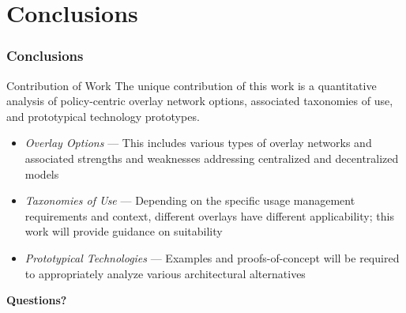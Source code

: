 \section{Conclusions}
\begin{frame}
\frametitle{Conclusions}
\begin{beamerboxesrounded}[shadow]{Contribution of Work}
The unique contribution of this work is a quantitative analysis of policy-centric overlay network options, associated taxonomies of use, and prototypical technology prototypes.
\end{beamerboxesrounded}
\begin{itemize}
\item \textit{Overlay Options} --- This includes various types of overlay networks and associated strengths and weaknesses addressing centralized and decentralized models
\item \textit{Taxonomies of Use} --- Depending on the specific usage management requirements and context, different overlays have different applicability; this work will provide guidance on suitability
\item \textit{Prototypical Technologies} --- Examples and proofs-of-concept will be required to appropriately analyze various architectural alternatives
\end{itemize}
\end{frame}

\begin{frame}[c]
\begin{center}
\textbf{Questions?}
\end{center}
\end{frame}